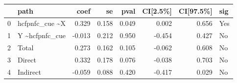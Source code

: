 \begin{tabular}{llrrrrrl}
\toprule
{} &             path &   coef &     se &   pval &  CI[2.5\%] &  CI[97.5\%] &  sig \\
\midrule
0 &  hcfpnfc\_cue \textasciitilde  X &  0.329 &  0.158 &  0.049 &     0.002 &      0.656 &  Yes \\
1 &  Y \textasciitilde  hcfpnfc\_cue & -0.013 &  0.212 &  0.950 &    -0.454 &      0.427 &   No \\
2 &            Total &  0.273 &  0.162 &  0.105 &    -0.062 &      0.608 &   No \\
3 &           Direct &  0.332 &  0.178 &  0.076 &    -0.038 &      0.703 &   No \\
4 &         Indirect & -0.059 &  0.088 &  0.420 &    -0.417 &      0.029 &   No \\
\bottomrule
\end{tabular}
